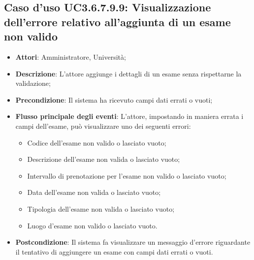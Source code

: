 \subsection{Caso d'uso \texorpdfstring{UC3.6.7.9.9}{UC3.6.7.9.9}: Visualizzazione dell'errore relativo all’aggiunta di un esame non valido}
\begin{itemize}
	\item \textbf{Attori}: Amministratore, Università;
	\item \textbf{Descrizione}: L'attore aggiunge i dettagli di un esame senza rispettarne la validazione;
	
	\item \textbf{Precondizione}: Il sistema ha ricevuto campi dati errati o vuoti;
	\item \textbf{Flusso principale degli eventi}: L'attore, impostando in maniera errata i campi dell'esame, può visualizzare uno dei seguenti errori:
	\begin{itemize}
		\item Codice dell’esame non valido o lasciato vuoto;
		\item Descrizione dell’esame non valida o lasciato vuoto;
		\item Intervallo di prenotazione per l’esame non valido o lasciato vuoto;
		\item Data dell’esame non valida o lasciato vuoto;
		\item Tipologia dell’esame non valida o lasciato vuoto;
		\item Luogo d’esame non valido o lasciato vuoto.
	\end{itemize}
	\item \textbf{Postcondizione}: Il sistema fa visualizzare un messaggio d'errore riguardante il tentativo di aggiungere un esame con campi dati errati o vuoti.
	
\end{itemize}
